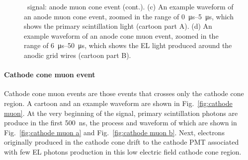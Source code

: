 \begin{figure}[!htbp]
\begin{subfigure}[b]{0.7\textwidth}
	\caption{}
	\label{fig:muon anode e}
\end{subfigure}
	\caption[\gtest\ signal: anode cone muon event (cont.).]{\gtest\ signal: anode muon cone event (cont.). (c) An example waveform of an anode muon cone event, zoomed in the range of \SIrange{0}{5}{\us}, which shows the primary scintillation light (cartoon part A). (d) An example waveform of an anode cone muon event, zoomed in the range of \SIrange{6}{50}{\us}, which shows the EL light produced around the anodic grid wires (cartoon part B).}
	\label{fig:anode muon cont}
\end{figure}

\paragraph{Cathode cone muon event}
\label{sec:events muon cathode cone}
Cathode cone muon events are those events that crosses only the cathode cone region. A cartoon and an example waveform are shown in Fig.~\ref{fig:cathode muon}. At the very beginning of the signal, primary scintillation photons are produce in the first \SI{500}{\ns}, the process and waveform of which are shown in Fig.~\ref{fig:cathode muon a} and Fig.~\ref{fig:cathode muon b}. Next, electrons originally produced in the cathode cone drift to the cathode PMT associated with few EL photons production in this low electric field cathode cone region. 


